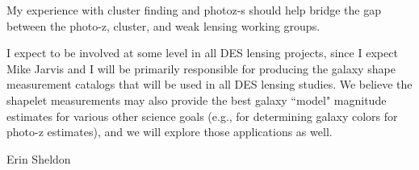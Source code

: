 \documentclass[12pt]{letter}
\begin{document}
My experience with cluster finding and photoz-s should help bridge the gap
between the photo-z, cluster, and weak lensing working groups.

I expect to be involved at some level in all DES lensing projects, since I
expect Mike Jarvis and I will be primarily responsible for producing the galaxy
shape measurement catalogs that will be used in all DES lensing studies. We
believe the shapelet measurements may also provide the best galaxy ``model"
magnitude estimates for various other science goals (e.g., for determining
galaxy colors for photo-z estimates), and we will explore those applications as
well.
\newline

{\noindent Erin Sheldon}
\end{document}

